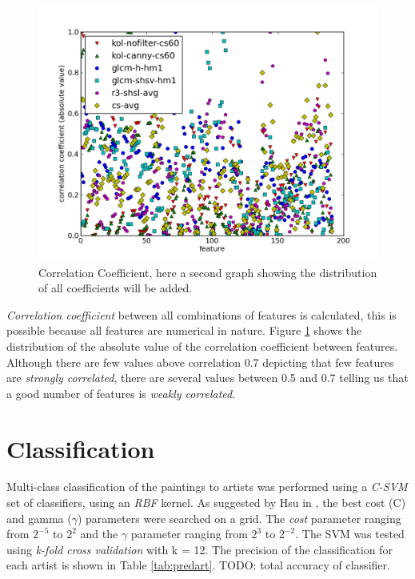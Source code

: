 \documentclass[11pt,a4paper,twoside,openright,draft]{report}
\begin{document}
\begin{multicols}{2}
\begin{figure}[tbp]
\centering
\includegraphics[width=\textwidth]{corr-graph}
\caption[Correlation]{Correlation Coefficient, here a second graph showing the
distribution of all coefficients will be added.}
\label{fig:corr}
\end{figure}

\emph{Correlation coefficient} between all combinations of features is
calculated, this is possible because all features are numerical in nature.
Figure \ref{fig:corr} shows the distribution of the absolute value of the
correlation coefficient between features.  Although there are few values above
correlation 0.7 depicting that few features are \emph{strongly correlated},
there are several values between 0.5 and 0.7 telling us that a good number of
features is \emph{weakly correlated}.

\section{Classification}

Multi-class classification of the paintings to artists was performed using a
\emph{C-SVM} set of classifiers, using an \emph{RBF} kernel.  As suggested by
Hsu in \cite{hcl03svm}, the best cost (C) and gamma ($\gamma$) parameters were
searched on a grid.  The \emph{cost} parameter ranging from $2^{-5}$ to $2^2$
and the $\gamma$ parameter ranging from $2^3$ to $2^{-2}$.  The SVM was tested
using \emph{k-fold cross validation} with k = 12.  The precision of the
classification for each artist is shown in Table \ref{tab:predart}.  TODO:
total accuracy of classifier.


\end{multicols}
\end{document}

